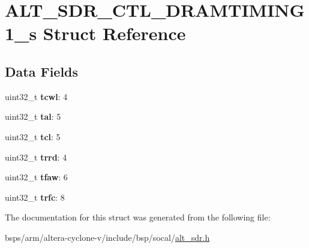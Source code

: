 \hypertarget{structALT__SDR__CTL__DRAMTIMING1__s}{}\section{A\+L\+T\+\_\+\+S\+D\+R\+\_\+\+C\+T\+L\+\_\+\+D\+R\+A\+M\+T\+I\+M\+I\+N\+G1\+\_\+s Struct Reference}
\label{structALT__SDR__CTL__DRAMTIMING1__s}
\subsection*{Data Fields}
\begin{DoxyCompactItemize}
\item 
\mbox{\label{structALT__SDR__CTL__DRAMTIMING1__s_a9e5b921a32e351b0f6303e2183b8d6df}} 
uint32\+\_\+t {\bfseries tcwl}\+: 4
\item 
\mbox{\label{structALT__SDR__CTL__DRAMTIMING1__s_a61699bc6df9cd96e0b8468f13a86f37f}} 
uint32\+\_\+t {\bfseries tal}\+: 5
\item 
\mbox{\label{structALT__SDR__CTL__DRAMTIMING1__s_a85b5ec79c1bfc801e690f8fe92d6f911}} 
uint32\+\_\+t {\bfseries tcl}\+: 5
\item 
\mbox{\label{structALT__SDR__CTL__DRAMTIMING1__s_a141339317030e33e5e1f3008b94460ac}} 
uint32\+\_\+t {\bfseries trrd}\+: 4
\item 
\mbox{\label{structALT__SDR__CTL__DRAMTIMING1__s_a7e0e52ff93e766785db0ddc81b093829}} 
uint32\+\_\+t {\bfseries tfaw}\+: 6
\item 
\mbox{\label{structALT__SDR__CTL__DRAMTIMING1__s_ae4c2c89875c47f45ad84891700cc0888}} 
uint32\+\_\+t {\bfseries trfc}\+: 8
\end{DoxyCompactItemize}


The documentation for this struct was generated from the following file\+:\begin{DoxyCompactItemize}
\item 
bsps/arm/altera-\/cyclone-\/v/include/bsp/socal/\mbox{\hyperlink{alt__sdr_8h}{alt\+\_\+sdr.\+h}}\end{DoxyCompactItemize}
